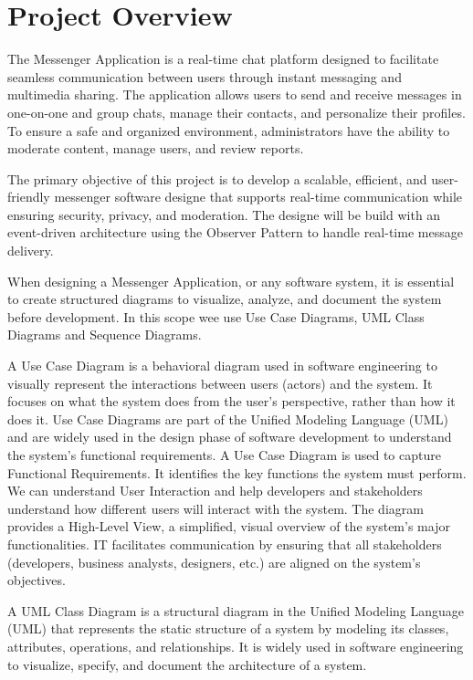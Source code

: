 
\chapter{Project Overview}\label{section:introduction}
\thispagestyle{pagestyle}


The Messenger Application is a real-time chat platform designed to facilitate seamless communication between users through instant messaging and multimedia sharing. The application allows users to send and receive messages in one-on-one and group chats, manage their contacts, and personalize their profiles. To ensure a safe and organized environment, administrators have the ability to moderate content, manage users, and review reports.


The primary objective of this project is to develop a scalable, efficient, and user-friendly messenger software designe that supports real-time communication while ensuring security, privacy, and moderation. The designe will be build with an event-driven architecture using the Observer Pattern to handle real-time message delivery.



When designing a Messenger Application, or any software system, it is essential to create structured diagrams to visualize, analyze, and document the system before development. In this scope wee use Use Case Diagrams, UML Class Diagrams and Sequence Diagrams.


A Use Case Diagram is a behavioral diagram used in software engineering to visually represent the interactions between users (actors) and the system. It focuses on what the system does from the user’s perspective, rather than how it does it. Use Case Diagrams are part of the Unified Modeling Language (UML) and are widely used in the design phase of software development to understand the system's functional requirements. A Use Case Diagram is used to capture Functional Requirements. It identifies the key functions the system must perform. We can understand User Interaction and help developers and stakeholders understand how different users will interact with the system. The diagram provides a High-Level View, a simplified, visual overview of the system's major functionalities. IT facilitates communication by ensuring that all stakeholders (developers, business analysts, designers, etc.) are aligned on the system’s objectives.

A UML Class Diagram is a structural diagram in the Unified Modeling Language (UML) that represents the static structure of a system by modeling its classes, attributes, operations, and relationships. It is widely used in software engineering to visualize, specify, and document the architecture of a system.







